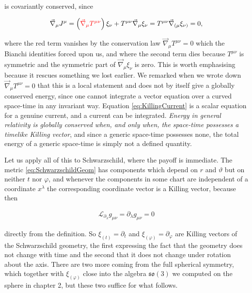         is covariantly conserved, since

        \begin{align*}
            \Vec{\nabla}_{\mu}J^{\mu} = \left({\color{red}\Vec{\nabla}_{\mu}T^{\mu\nu}}\right)\xi_{\nu} + T^{\mu\nu}\Vec{\nabla}_{\mu}\xi_{\nu} = T^{\mu\nu}\Vec{\nabla}_{(\mu}\xi_{\nu)} = 0,
        \end{align*}

        where the red term vanishes by the conservation law $\Vec{\nabla}_{\mu}T^{\mu\nu}=0$ which the Bianchi identities forced upon us, and where the second term dies because $T^{\mu\nu}$ is symmetric and the symmetric part of $\Vec{\nabla}_{\mu}\xi_{\nu}$ is zero. This is worth emphasising because it rescues something we lost earlier. We remarked when we wrote down $\Vec{\nabla}_{\mu}T^{\mu\nu}=0$ that this is a local statement and does not by itself give a globally conserved energy, since one cannot integrate a vector equation over a curved space-time in any invariant way. Equation \ref{eq:KillingCurrent} is a scalar equation for a genuine current, and a current can be integrated. \textit{Energy in general relativity is globally conserved when, and only when, the space-time possesses a timelike Killing vector}, and since a generic space-time possesses none, the total energy of a generic space-time is simply not a defined quantity.

        Let us apply all of this to Schwarzschild, where the payoff is immediate. The metric \ref{eq:SchwarzschildGeom} has components which depend on $r$ and $\vartheta$ but on neither $t$ nor $\varphi$, and whenever the components in some chart are independent of a coordinate $x^{\lambda}$ the corresponding coordinate vector is a Killing vector, because then

        \begin{align*}
            \mathcal{L}_{\partial_{\lambda}}g_{\mu\nu} = \partial_{\lambda}g_{\mu\nu} = 0
        \end{align*}

        directly from the definition. So $\xi_{(t)}=\partial_t$ and $\xi_{(\varphi)}=\partial_{\varphi}$ are Killing vectors of the Schwarzschild geometry, the first expressing the fact that the geometry does not change with time and the second that it does not change under rotation about the axis. There are two more coming from the full spherical symmetry, which together with $\xi_{(\varphi)}$ close into the algebra $\mathfrak{so}(3)$ we computed on the sphere in chapter 2, but these two suffice for what follows.

